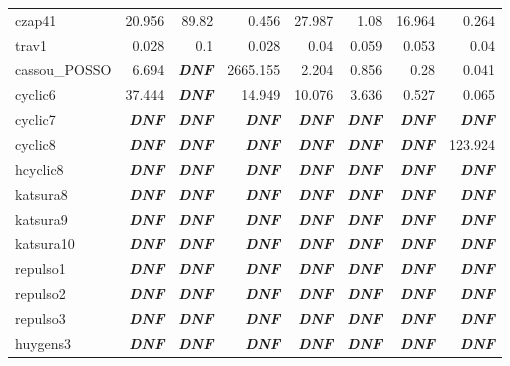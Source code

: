 \documentclass[letterpaper,12pt,titlepage,oneside,final]{book}
\begin{document}
\begin{center}
\begin{tabular}{| l || r | r | r || r | r || r | r ||}
  czap41 & 20.956 & 89.82 & 0.456 & 27.987 & 1.08 & 16.964 & 0.264\\
  trav1 & 0.028 & 0.1 & 0.028 & 0.04 & 0.059 & 0.053 & 0.04\\
  cassou\_POSSO & 6.694 & \textbf{\textit{DNF}} & 2665.155 & 2.204 & 0.856 & 0.28 & 0.041\\
  cyclic6 & 37.444 & \textbf{\textit{DNF}} & 14.949 & 10.076 & 3.636 & 0.527 & 0.065\\
  cyclic7 & \textbf{\textit{DNF}} & \textbf{\textit{DNF}} & \textbf{\textit{DNF}} & \textbf{\textit{DNF}} & \textbf{\textit{DNF}} & \textbf{\textit{DNF}} & \textbf{\textit{DNF}}\\
  cyclic8 & \textbf{\textit{DNF}} & \textbf{\textit{DNF}} & \textbf{\textit{DNF}} & \textbf{\textit{DNF}} & \textbf{\textit{DNF}} & \textbf{\textit{DNF}} & 123.924\\
  hcyclic8 & \textbf{\textit{DNF}} & \textbf{\textit{DNF}} & \textbf{\textit{DNF}} & \textbf{\textit{DNF}} & \textbf{\textit{DNF}} & \textbf{\textit{DNF}} & \textbf{\textit{DNF}}\\
  katsura8 & \textbf{\textit{DNF}} & \textbf{\textit{DNF}} & \textbf{\textit{DNF}} & \textbf{\textit{DNF}} & \textbf{\textit{DNF}} & \textbf{\textit{DNF}} & \textbf{\textit{DNF}}\\
  katsura9 & \textbf{\textit{DNF}} & \textbf{\textit{DNF}} & \textbf{\textit{DNF}} & \textbf{\textit{DNF}} & \textbf{\textit{DNF}} & \textbf{\textit{DNF}} & \textbf{\textit{DNF}}\\
  katsura10 & \textbf{\textit{DNF}} & \textbf{\textit{DNF}} & \textbf{\textit{DNF}} & \textbf{\textit{DNF}} & \textbf{\textit{DNF}} & \textbf{\textit{DNF}} & \textbf{\textit{DNF}}\\
  repulso1 & \textbf{\textit{DNF}} & \textbf{\textit{DNF}} & \textbf{\textit{DNF}} & \textbf{\textit{DNF}} & \textbf{\textit{DNF}} & \textbf{\textit{DNF}} & \textbf{\textit{DNF}}\\
  repulso2 & \textbf{\textit{DNF}} & \textbf{\textit{DNF}} & \textbf{\textit{DNF}} & \textbf{\textit{DNF}} & \textbf{\textit{DNF}} & \textbf{\textit{DNF}} & \textbf{\textit{DNF}}\\
  repulso3 & \textbf{\textit{DNF}} & \textbf{\textit{DNF}} & \textbf{\textit{DNF}} & \textbf{\textit{DNF}} & \textbf{\textit{DNF}} & \textbf{\textit{DNF}} & \textbf{\textit{DNF}}\\
  huygens3 & \textbf{\textit{DNF}} & \textbf{\textit{DNF}} & \textbf{\textit{DNF}} & \textbf{\textit{DNF}} & \textbf{\textit{DNF}} & \textbf{\textit{DNF}} & \textbf{\textit{DNF}}
  \\ %
  \hline
  \end{tabular}
\end{center}
\doublespacing
\end{document}
